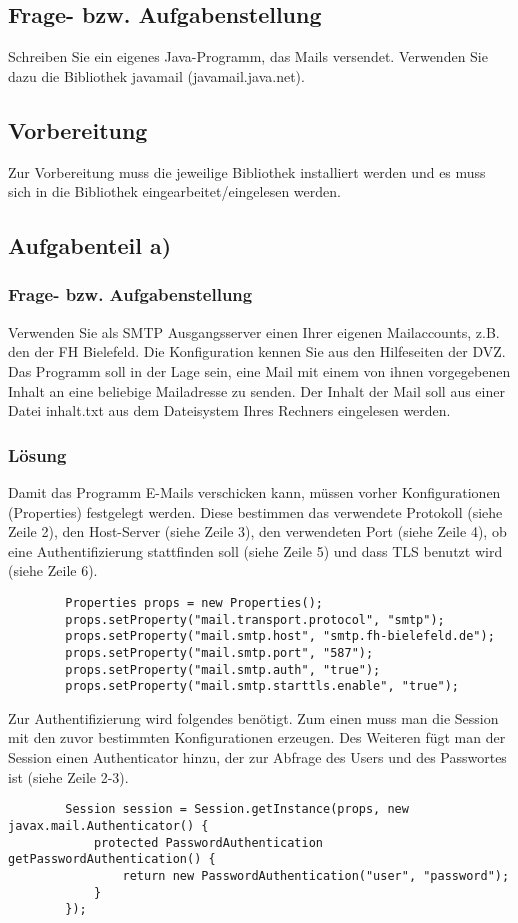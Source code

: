 \subsection{Frage- bzw. Aufgabenstellung}
Schreiben Sie ein eigenes Java-Programm, das Mails versendet. Verwenden Sie dazu die Bibliothek javamail (javamail.java.net). 

\subsection{Vorbereitung}
Zur Vorbereitung muss die jeweilige Bibliothek installiert werden und es muss sich in die Bibliothek eingearbeitet/eingelesen werden.

\subsection{Aufgabenteil a)}
\subsubsection{Frage- bzw. Aufgabenstellung}

Verwenden Sie als SMTP Ausgangsserver einen Ihrer eigenen Mailaccounts, z.B. den der FH Bielefeld. Die Konfiguration kennen Sie aus den Hilfeseiten der DVZ. Das Programm soll in der Lage sein, eine Mail mit einem von ihnen vorgegebenen Inhalt an eine beliebige Mailadresse zu senden. Der Inhalt der Mail soll aus einer Datei inhalt.txt aus dem Dateisystem Ihres Rechners eingelesen werden.

\subsubsection{Lösung}
Damit das Programm E-Mails verschicken kann, müssen vorher Konfigurationen (Properties) festgelegt werden. Diese bestimmen das verwendete Protokoll (siehe Zeile 2), den Host-Server (siehe Zeile 3), den verwendeten Port (siehe Zeile 4), ob eine Authentifizierung stattfinden soll (siehe Zeile 5) und dass TLS benutzt wird (siehe Zeile 6).
\begin{lstlisting}
		Properties props = new Properties();
		props.setProperty("mail.transport.protocol", "smtp");
		props.setProperty("mail.smtp.host", "smtp.fh-bielefeld.de");
		props.setProperty("mail.smtp.port", "587");
		props.setProperty("mail.smtp.auth", "true");
		props.setProperty("mail.smtp.starttls.enable", "true");
\end{lstlisting}


Zur Authentifizierung wird folgendes benötigt. Zum einen muss man die Session mit den zuvor bestimmten Konfigurationen erzeugen. Des Weiteren fügt man der Session einen Authenticator hinzu, der zur Abfrage des Users und des Passwortes ist (siehe Zeile 2-3).
\begin{lstlisting}
		Session session = Session.getInstance(props, new javax.mail.Authenticator() {
			protected PasswordAuthentication getPasswordAuthentication() {
				return new PasswordAuthentication("user", "password");
			}
		});
\end{lstlisting}


